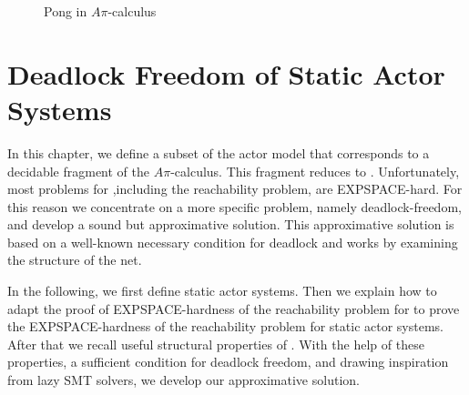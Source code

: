 \documentclass[a4paper]{report}
\numberwithin{algorithm}{chapter}
\begin{document}
\begin{figure}[ht]
  \centering
{}
  \caption{Pong in $A\pi$-calculus}
  \label{piPong}
\end{figure}

\chapter{Deadlock Freedom of Static Actor Systems}
\label{chapStatic}
In this chapter, we define a subset of the actor model that corresponds to a decidable fragment of the $A\pi$-calculus.
This fragment reduces to \pns{}.
Unfortunately, most problems for \pns{},including the reachability problem, are EXPSPACE-hard.
For this reason we concentrate on a more specific problem, namely deadlock-freedom, and develop a sound but approximative solution.
This approximative solution is based on a well-known necessary condition for deadlock and works by examining the structure of the net.

In the following, we first define static actor systems.
Then we explain how to adapt the proof of EXPSPACE-hardness of the reachability problem for \pns{} to prove the EXPSPACE-hardness of the reachability problem for static actor systems.
After that we recall useful structural properties of \pns{}.
With the help of these properties, a sufficient condition for deadlock freedom, and drawing inspiration from lazy SMT solvers\cite{Moura02lemmason}, we develop our approximative solution.
\end{document}
